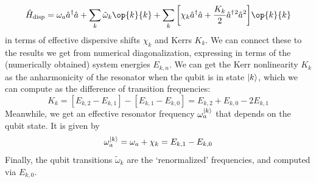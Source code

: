 \begin{equation}
    \hat{H}_{\rm disp} = \omega_a \hat{a}^\dagger\hat{a} + \sum_k \tilde{\omega}_k \op{k}{k} + \sum_k \bigg[\chi_k\hat{a}^\dagger\hat{a} + \frac{K_k}{2}\hat{a}^\dagger{}^2\hat{a}^2\bigg] \op{k}{k}
\end{equation}
in terms of effective dispersive shifts $\chi_k$ and Kerrs $K_k$. We can connect these to the results we get from numerical diagonalization, expressing in terms of the (numerically obtained) system energies $E_{k, n}$. We can get the Kerr nonlinearity $K_k$ as the anharmonicity of the resonator when the qubit is in state $\lvert k\rangle$, which we can compute as the difference of transition frequencies: 
\begin{equation}
    K_k = [E_{k, 2} - E_{k, 1}] - [E_{k, 1} - E_{k, 0}] = E_{k, 2} + E_{k, 0} - 2E_{k, 1}
\end{equation}
Meanwhile, we get an effective  resonator frequency $\omega_a^{\lvert k\rangle}$ that depends on the qubit state. It is given by
\begin{equation}
    \omega_a^{\lvert k\rangle} = \omega_a + \chi_k = E_{k, 1} - E_{k, 0}
\end{equation}
Finally, the qubit transitions $\tilde{\omega}_k$ are the `renormalized' frequencies, and computed via $E_{k, 0}$. 

